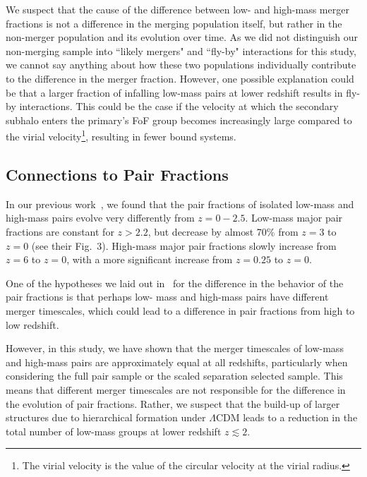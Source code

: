 \documentclass[twocolumn,linenumbers]{aastex631}
\newcommand{\chambe}{\citet{Chamberlain2024}}
\begin{document}
        We suspect that the cause of the difference between low- and high-mass merger fractions is not a difference in the merging population itself, but rather in the non-merger population and its evolution over time. 
        As we did not distinguish our non-merging sample into ``likely mergers" and ``fly-by" interactions for this study, we cannot say anything about how these two populations individually contribute to the difference in the merger fraction.
        However, one possible explanation could be that a larger fraction of infalling low-mass pairs at lower redshift results in fly-by interactions. 
        This could be the case if the velocity at which the secondary subhalo enters the primary's FoF group becomes increasingly large compared to the virial velocity\footnote{The virial velocity is the value of the circular velocity at the virial radius.}, resulting in fewer bound systems. 


    \subsection{Connections to Pair Fractions}
        In our previous work~\citep{Chamberlain2024}, we found that the pair fractions of isolated low-mass and high-mass pairs evolve very differently from $z=0-2.5$. 
        Low-mass major pair fractions are constant for $z>2.2$, but decrease by almost 70\% from $z=3$ to $z=0$ (see their Fig.~3). 
        High-mass major pair fractions slowly increase from $z=6$ to $z=0$, with a more significant increase from $z=0.25$ to $z=0$.
    
        One of the hypotheses we laid out in~\chambe{} for the difference in the behavior of the pair fractions is that perhaps low- mass and high-mass pairs have different merger timescales, which could lead to a difference in pair fractions from high to low redshift.
        
        However, in this study, we have shown that the merger timescales of low-mass and high-mass pairs are approximately equal at all redshifts, particularly when considering the full pair sample or the scaled separation selected sample. 
        This means that different merger timescales are not responsible for the difference in the evolution of pair fractions. 
        Rather, we suspect that the build-up of larger structures due to hierarchical formation under $\Lambda$CDM leads to a reduction in the total number of low-mass groups at lower redshift $z\lesssim2$. 
    
\end{document}
